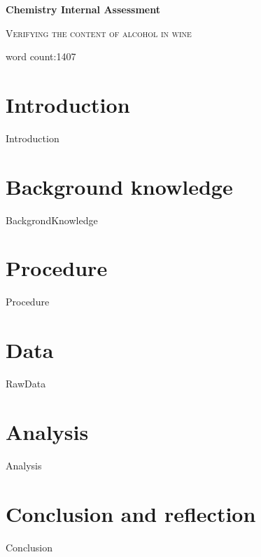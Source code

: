 \documentclass[12pt,a4paper]{article}
\begin{document}
\begin{titlepage}
	\centering
	{\huge\bfseries Chemistry Internal Assessment\par}
	\vspace{1cm}
	{\scshape\Large Verifying the content of alcohol in wine\par}
	{word count:1407}
\end{titlepage}

\tableofcontents

\section{Introduction}
{Introduction}

\section{Background knowledge}
{BackgrondKnowledge}

\section{Procedure}
{Procedure}

\section{Data}
{RawData}


\section{Analysis}
{Analysis}


\section{Conclusion and reflection}
{Conclusion}


\end{document}
